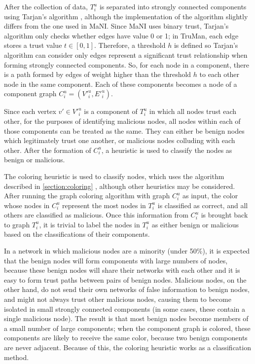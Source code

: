After the collection of data, $T^u_i$ is separated into strongly connected components using Tarjan's algorithm \citep{tarjan1972depth}, although the implementation of the algorithm slightly differs from the one used in MaNI.
Since MaNI uses binary trust, Tarjan's algorithm only checks whether edges have value 0 or 1; in TruMan, each edge stores a trust value $t \in [0, 1]$.%
Therefore, a threshold $h$ is defined so Tarjan's algorithm can consider only edges represent a significant trust relationship when forming strongly connected components.
So, for each node in a component, there is a path formed by edges of weight higher than the threshold $h$ to each other node in the same component.
Each of these components becomes a node of a component graph $C^u_i = (V'^u_i, E'^u_i)$.

Since each vertex $v' \in V'^u_i$ is a component of $T^u_i$ in which all nodes trust each other, for the purposes of identifying malicious nodes, all nodes within each of those components can be treated as the same.
They can either be benign nodes which legitimately trust one another, or malicious nodes colluding with each other.
After the formation of $C^u_i$, a heuristic is used to classify the nodes as benign or malicious.

The coloring heuristic is used to classify nodes, which uses the algorithm described in \autoref{section:coloring} \citep{mittal2011graph}, although other heuristics may be considered.
After running the graph coloring algorithm with graph $C^u_i$ as input, the color whose nodes in $C^u_i$ represent the most nodes in $T^u_i$ is classified as correct, and all others are classified as malicious.
Once this information from $C^u_i$ is brought back to graph $T^u_i$, it is trivial to label the nodes in $T^u_i$ as either benign or malicious based on the classifications of their components.

In a network in which malicious nodes are a minority (under 50\%), it is expected that the benign nodes will form components with large numbers of nodes, because these benign nodes will share their networks with each other and it is easy to form trust paths between pairs of benign nodes.
Malicious nodes, on the other hand, do not send their own networks of false information to benign nodes, and might not always trust other malicious nodes, causing them to become isolated in small strongly connected components (in some cases, these contain a single malicious node).
The result is that most benign nodes become members of a small number of large components; when the component graph is colored, these components are likely to receive the same color, because two benign components are never adjacent.
Because of this, the coloring heuristic works as a classification method.

